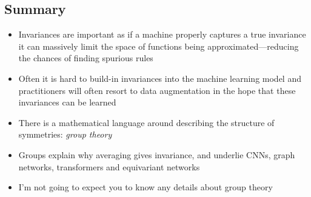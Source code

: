 \begin{slide}
\section[-2]{Summary}

\begin{PauseHighLight}
  \begin{itemize}
  \item Invariances are important as if a machine properly captures a
    true invariance it can massively limit the space of functions
    being approximated\pause---reducing the chances of finding
    spurious rules\pauseb
  \item Often it is hard to build-in invariances into the machine
    learning model and practitioners will often resort to data
    augmentation in the hope that these invariances can be
    learned\pause
  \item There is a mathematical language around describing the
    structure of symmetries: \emph{group theory}\pause
  \item Groups explain why averaging gives invariance, and underlie
    CNNs, graph networks, transformers and equivariant networks\pause
  \item I'm not going to expect you to know any details about group
    theory\pauseb
  \end{itemize}
\end{PauseHighLight}

\end{slide}


